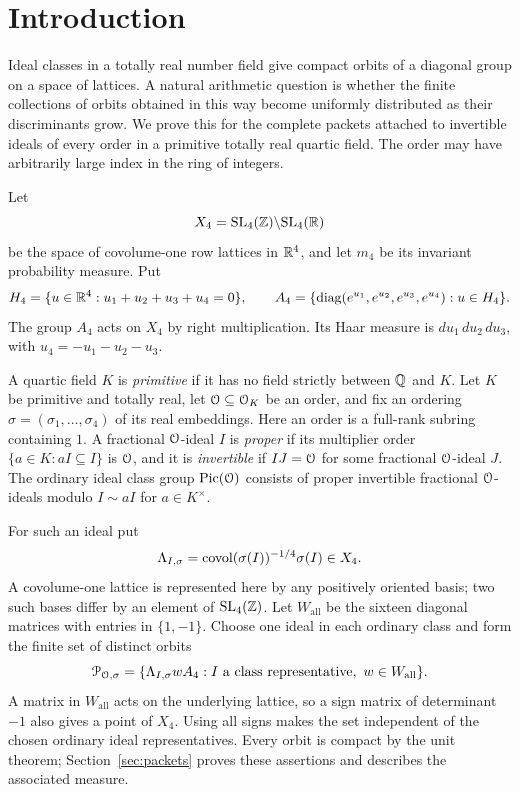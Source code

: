 \section{Introduction}\label{sec:introduction}

Ideal classes in a totally real number field give compact orbits of a
diagonal group on a space of lattices.  A natural arithmetic question is
whether the finite collections of orbits obtained in this way become
uniformly distributed as their discriminants grow.  We prove this for the
complete packets attached to invertible ideals of every order in a primitive
totally real quartic field.  The order may have arbitrarily large index in
the ring of integers.

Let
\[
 X_4=\mathrm{SL}_4(\mathbb Z)\backslash\mathrm{SL}_4(\mathbb R)
\]
be the space of covolume-one row lattices in $\mathbb R^4$, and let $m_4$ be its
invariant probability measure.  Put
\[
 H_4=\{u\in\mathbb R^4:u_1+u_2+u_3+u_4=0\},\qquad
 A_4=\{\operatorname{diag}(e^{u_1},e^{u_2},e^{u_3},e^{u_4}):u\in H_4\}.
\]
The group $A_4$ acts on $X_4$ by right multiplication.  Its Haar measure
is $du_1\,du_2\,du_3$, with $u_4=-u_1-u_2-u_3$.

A quartic field $K$ is \emph{primitive} if it has no field strictly between
$\mathbb Q$ and $K$.  Let $K$ be primitive and totally real, let $\mathcal O\subseteq\mathcal O_K$
be an order, and fix an ordering $\sigma=(\sigma_1,\ldots,\sigma_4)$ of its
real embeddings.  Here an order is a full-rank subring containing $1$.
A fractional $\mathcal O$-ideal $I$ is \emph{proper} if its multiplier order
$\{a\in K:aI\subseteq I\}$ is $\mathcal O$, and it is \emph{invertible} if
$IJ=\mathcal O$ for some fractional $\mathcal O$-ideal $J$.  The ordinary ideal class
group $\operatorname{Pic}(\mathcal O)$ consists of proper invertible fractional $\mathcal O$-ideals
modulo $I\sim aI$ for $a\in K^\times$.

For such an ideal put
\begin{equation}\label{eq:intro-lattice}
 \Lambda_{I,\sigma}
   =\operatorname{covol}(\sigma(I))^{-1/4}\sigma(I)\in X_4.
\end{equation}
A covolume-one lattice is represented here by any positively oriented
basis; two such bases differ by an element of $\mathrm{SL}_4(\mathbb Z)$.
Let $W_{\mathrm{all}}$ be the sixteen diagonal matrices with entries in
$\{1,-1\}$.  Choose one ideal in each ordinary class and form the finite
set of distinct orbits
\[
 \mathcal P_{\mathcal O,\sigma}
 =\{\Lambda_{I,\sigma}wA_4:I\text{ a class representative},\
                                      w\in W_{\mathrm{all}}\}.
\]
A matrix in $W_{\mathrm{all}}$ acts on the underlying lattice, so a sign
matrix of determinant $-1$ also gives a point of $X_4$.  Using all signs
makes the set independent of the chosen ordinary ideal representatives.
Every orbit is compact by the unit theorem; Section~\ref{sec:packets}
proves these assertions and describes the associated measure.

